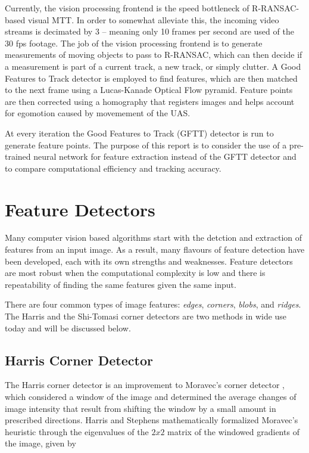 \documentclass[hidelinks]{article}
\begin{document}
Currently, the vision processing frontend is the speed bottleneck of R-RANSAC-based visual MTT. In order to somewhat alleviate this, the incoming video streams is decimated by 3 -- meaning only 10 frames per second are used of the 30 fps footage. The job of the vision processing frontend is to generate measurements of moving objects to pass to R-RANSAC, which can then decide if a measurement is part of a current track, a new track, or simply clutter. A Good Features to Track detector is employed to find features, which are then matched to the next frame using a Lucas-Kanade Optical Flow pyramid. Feature points are then corrected using a homography that registers images and helps account for egomotion caused by movemement of the UAS.

At every iteration the Good Features to Track (GFTT) detector is run to generate feature points. The purpose of this report is to consider the use of a pre-trained neural network for feature extraction instead of the GFTT detector and to compare computational efficiency and tracking accuracy.


\section{Feature Detectors}\label{sec:feature_detection}
Many computer vision based algorithms start with the detction and extraction of features from an input image. As a result, many flavours of feature detection have been developed, each with its own strengths and weaknesses. Feature detectors are most robust when the computational complexity is low and there is repeatability of finding the same features given the same input.

There are four common types of image features: \textit{edges}, \textit{corners}, \textit{blobs}, and \textit{ridges}. The Harris and the Shi-Tomasi corner detectors are two methods in wide use today and will be discussed below.

\subsection{Harris Corner Detector}
The Harris corner detector \cite{Harris1988} is an improvement to Moravec's corner detector \cite{Moravec1980}, which considered a window of the image and determined the average changes of image intensity that result from shifting the window by a small amount in prescribed directions. Harris and Stephens mathematically formalized Moravec's heuristic through the eigenvalues of the $2x2$ matrix of the windowed gradients of the image, given by
\end{document}
